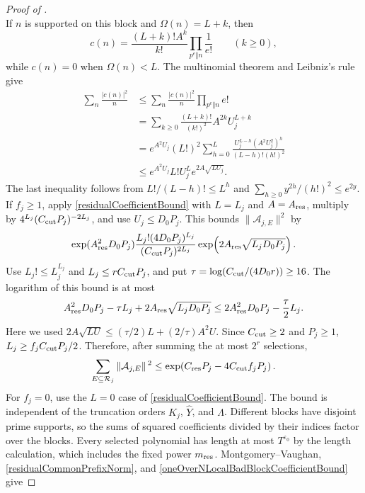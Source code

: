 \documentclass[oneside, 12pt]{amsart}
\theoremstyle{definition}
\begin{document}
{\begin{proof}[Proof of ]
\[			\]
			If $n$ is supported on this block and $\Omega(n)=L+k$, then
			\[
			c(n)=\frac{(L+k)!A^k}{k!}
			\prod_{p^e\Vert n}\frac1{e!}\qquad(k\geq0),
			\]
			while $c(n)=0$ when $\Omega(n)<L$. The multinomial theorem and
			Leibniz's rule give
			\begin{align}
				\sum_n\frac{|c(n)|^2}{n}
				&\leq\sum_n\frac{|c(n)|^2}{n}\prod_{p^e\Vert n}e!
				\nonumber\\
				&=\sum_{k\geq0}\frac{(L+k)!}{(k!)^2}
				A^{2k}U_j^{L+k}\nonumber\\
				&=e^{A^2U_j}(L!)^2
				\sum_{h=0}^L
				\frac{U_j^{L-h}(A^2U_j^2)^h}{(L-h)!(h!)^2}
				\nonumber\\
				&\leq e^{A^2U_j}L!U_j^L e^{2A\sqrt{LU_j}}.
				\label{residualCoefficientBound}
			\end{align}
			The last inequality follows from $L!/(L-h)!\leq L^h$ and
			$\sum_{h\geq0}y^{2h}/(h!)^2\leq e^{2y}$.
			If $f_j\geq1$, apply \eqref{residualCoefficientBound} with $L=L_j$ and
			$A=A_{\rm res}$, multiply by $4^{L_j}(C_{\rm cut}P_j)^{-2L_j}$,
			and use $U_j\leq D_0P_j$. This bounds $\|\mathcal A_{j,E}\|^2$ by
			\[
			\exp(A_{\rm res}^2D_0P_j)
			\frac{L_j!(4D_0P_j)^{L_j}}
			{(C_{\rm cut}P_j)^{2L_j}}
			\exp\!\left(2A_{\rm res}\sqrt{L_jD_0P_j}\right).
			\]
			Use $L_j!\leq L_j^{L_j}$ and
			$L_j\leq rC_{\rm cut}P_j$, and put
			$\tau=\log(C_{\rm cut}/(4D_0r))\geq16$.
			The logarithm of this bound is at most
			\[
			A_{\rm res}^2D_0P_j-\tau L_j
			+2A_{\rm res}\sqrt{L_jD_0P_j}
			\leq 2A_{\rm res}^2D_0P_j-\frac{\tau}{2}L_j.
			\]
			Here we used
			$2A\sqrt{LU}\leq(\tau/2)L+(2/\tau)A^2U$.
			Since $C_{\rm cut}\geq2$ and $P_j\geq1$,
			$L_j\geq f_jC_{\rm cut}P_j/2$.  Therefore, after summing the
			at most $2^r$ selections,
			\begin{equation}\label{oneOverNLocalBadBlockCoefficientBound}
				\sum_{E\subseteq\mathcal R_j}
				\|\mathcal A_{j,E}\|^{\,2}
				\leq
				\exp\!\left(C_{\rm res}P_j
				-4C_{\rm cut}f_jP_j\right).
			\end{equation}
			For $f_j=0$, use the $L=0$ case of
			\eqref{residualCoefficientBound}.  The bound is independent of
			the truncation orders $K_j$, $\widehat Y$, and $\Lambda$.
			Different blocks have disjoint prime supports, so the sums of squared
			coefficients divided by their indices factor over the blocks.  Every selected polynomial has length
			at most $T^{\varepsilon_0}$ by the length calculation, which
			includes the fixed power $m_{\rm res}$.  Montgomery--Vaughan,
			\eqref{residualCommonPrefixNorm}, and
			\eqref{oneOverNLocalBadBlockCoefficientBound} give

\end{proof}}
\end{document}

